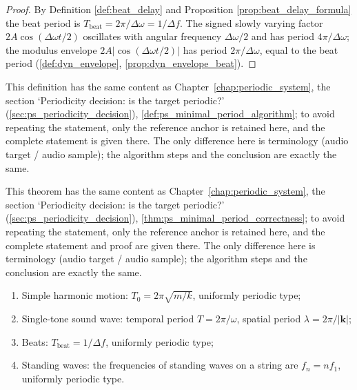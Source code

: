 \begin{proof}
By Definition \ref{def:beat_delay} and Proposition \ref{prop:beat_delay_formula} the beat period is $T_{\text{beat}}=2\pi/\Delta\omega=1/\Delta f$. The signed slowly varying factor $2A\cos(\Delta\omega t/2)$ oscillates with angular frequency $\Delta\omega/2$ and has period $4\pi/\Delta\omega$; the modulus envelope $2A|\cos(\Delta\omega t/2)|$ has period $2\pi/\Delta\omega$, equal to the beat period (\cref{def:dyn_envelope}, \cref{prop:dyn_envelope_beat}).
\end{proof}

\begin{definition}\label{def:audio_minimal_period_algorithm}
This definition has the same content as Chapter~\ref{chap:periodic_system}, the section `Periodicity decision: is the target periodic?' (\cref{sec:ps_periodicity_decision}), \cref{def:ps_minimal_period_algorithm}; to avoid repeating the statement, only the reference anchor is retained here, and the complete statement is given there. The only difference here is terminology (audio target / audio sample); the algorithm steps and the conclusion are exactly the same.
\end{definition}

\begin{theorem}\label{thm:audio_minimal_period_correctness}
This theorem has the same content as Chapter~\ref{chap:periodic_system}, the section `Periodicity decision: is the target periodic?' (\cref{sec:ps_periodicity_decision}), \cref{thm:ps_minimal_period_correctness}; to avoid repeating the statement, only the reference anchor is retained here, and the complete statement and proof are given there. The only difference here is terminology (audio target / audio sample); the algorithm steps and the conclusion are exactly the same.
\end{theorem}

\begin{example}\label{ex:audio_periodic_examples}
\begin{enumerate}[label=(\roman*)]
    \item Simple harmonic motion: $T_0=2\pi\sqrt{m/k}$, uniformly periodic type;
    \item Single-tone sound wave: temporal period $T=2\pi/\omega$, spatial period $\lambda=2\pi/|\mathbf k|$;
    \item Beats: $T_{\text{beat}}=1/\Delta f$, uniformly periodic type;
    \item Standing waves: the frequencies of standing waves on a string are $f_n=n f_1$, uniformly periodic type.
\end{enumerate}
\end{example}

